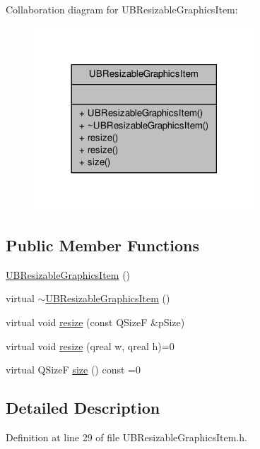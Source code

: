 Collaboration diagram for U\-B\-Resizable\-Graphics\-Item\-:
\nopagebreak
\begin{figure}[H]
\begin{center}
\leavevmode
\includegraphics[width=234pt]{d9/db1/class_u_b_resizable_graphics_item__coll__graph}
\end{center}
\end{figure}
\subsection*{Public Member Functions}
\begin{DoxyCompactItemize}
\item 
\hyperlink{class_u_b_resizable_graphics_item_a0150b8e3b816abac5af0e1e9b2ad087a}{U\-B\-Resizable\-Graphics\-Item} ()
\item 
virtual \hyperlink{class_u_b_resizable_graphics_item_a628fe366eb7862a7adc92fa4e2269575}{$\sim$\-U\-B\-Resizable\-Graphics\-Item} ()
\item 
virtual void \hyperlink{class_u_b_resizable_graphics_item_a3d337d44f263b4f811afe848e1f17d26}{resize} (const Q\-Size\-F \&p\-Size)
\item 
virtual void \hyperlink{class_u_b_resizable_graphics_item_a24170d361b212d175220e8db501566f5}{resize} (qreal w, qreal h)=0
\item 
virtual Q\-Size\-F \hyperlink{class_u_b_resizable_graphics_item_a97d0d97df113d870f0e463ace0b050c7}{size} () const =0
\end{DoxyCompactItemize}


\subsection{Detailed Description}


Definition at line 29 of file U\-B\-Resizable\-Graphics\-Item.\-h.



